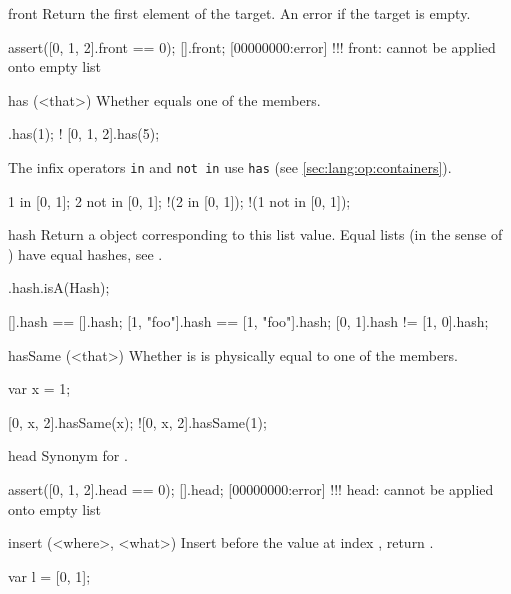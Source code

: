 \begin{urbiscriptapi}
\item[front]
  Return the first element of the target. An error if the target is
  empty.
\begin{urbiscript}
assert([0, 1, 2].front == 0);
[].front;
[00000000:error] !!! front: cannot be applied onto empty list
\end{urbiscript}


\item[has](<that>)%
  Whether \that equals one of the members.

\begin{urbiassert}
  [0, 1, 2].has(1);
! [0, 1, 2].has(5);
\end{urbiassert}

  The infix operators \lstinline|in| and \lstinline|not in| use
  \lstinline|has| (see \autoref{sec:lang:op:containers}).

\begin{urbiassert}
  1 in     [0, 1];
  2 not in [0, 1];
!(2 in     [0, 1]);
!(1 not in [0, 1]);
\end{urbiassert}


\item[hash] Return a  object corresponding to this list
  value. Equal lists (in the sense of ) have equal hashes, see
  .

\begin{urbiassert}
[].hash.isA(Hash);

        [].hash == [].hash;
[1, "foo"].hash == [1, "foo"].hash;
    [0, 1].hash != [1, 0].hash;
\end{urbiassert}


\item[hasSame](<that>)%
  Whether \that is is physically equal to one of the members.
\begin{urbiassert}
var x = 1;

 [0, x, 2].hasSame(x);
![0, x, 2].hasSame(1);
\end{urbiassert}


\item[head]
  Synonym for .
\begin{urbiscript}
assert([0, 1, 2].head == 0);
[].head;
[00000000:error] !!! head: cannot be applied onto empty list
\end{urbiscript}


\item[insert](<where>, <what>)%
  Insert  before the value at index , return
  \this.
\begin{urbiassert}
var l = [0, 1];


\end{urbiassert}
\end{urbiscriptapi}
